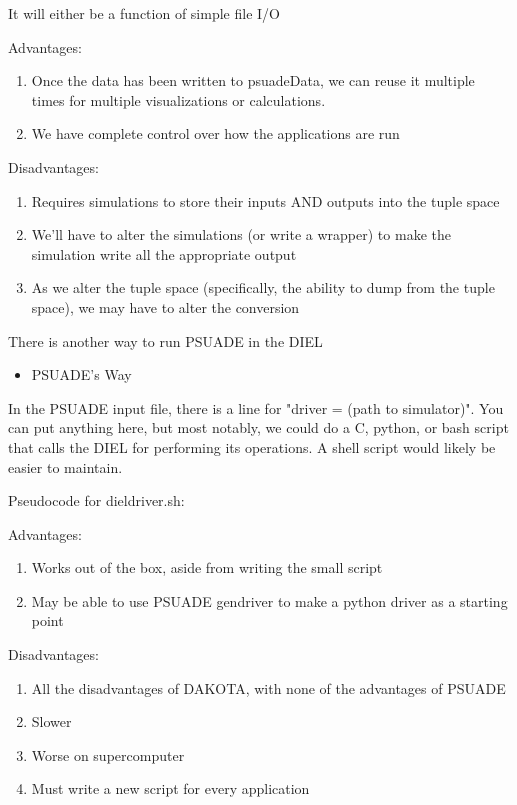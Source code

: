 \documentclass[11pt]{article} %
\begin{document}
It will either be a function of simple file I/O 

Advantages:
\begin{enumerate}
	\item Once the data has been written to psuadeData, we can reuse it multiple times for multiple visualizations or calculations.
	\item We have complete control over how the applications are run
\end{enumerate}

Disadvantages:
\begin{enumerate}
	\item Requires simulations to store their inputs AND outputs into the tuple space
	\item We'll have to alter the simulations (or write a wrapper) to make the simulation write all the appropriate output
	\item As we alter the tuple space (specifically, the ability to dump from the tuple space), we may have to alter the conversion
\end{enumerate}

There is another way to run PSUADE in the DIEL

\begin{itemize}
	\item PSUADE's Way\\
\end{itemize}

In the PSUADE input file, there is a line for "driver = (path to simulator)". You can put anything here, but most notably, we could do a C, python, or bash script that calls the DIEL for performing its operations. A shell script would likely be easier to maintain.


Pseudocode for dieldriver.sh:


Advantages:
\begin{enumerate}
	\item Works out of the box, aside from writing the small script
	\item May be able to use PSUADE gendriver to make a python driver as a starting point
\end{enumerate}
Disadvantages:
\begin{enumerate}
	\item All the disadvantages of DAKOTA, with none of the advantages of PSUADE
	\item Slower
	\item Worse on supercomputer
	\item Must write a new script for every application
\end{enumerate}
\end{document}
